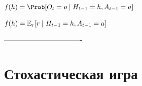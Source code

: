 \documentclass[../main.tex]{subfiles}
\begin{document}
$f(h)=\Prob[O_t=o \mid H_{t-1}=h, A_{t-1}=a]$

$f(h)=\mathbb{E}_r[r \mid H_{t-1}=h, A_{t-1}=a]$


----------------------------------


\section{Стохастическая игра}
\end{document}
